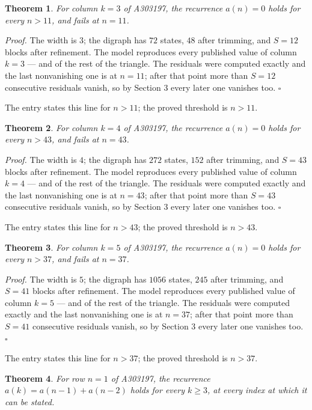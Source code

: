 \documentclass[11pt]{article}
\newtheorem{theorem}{Theorem}
\theoremstyle{definition}
\begin{document}
\begin{theorem} For column $k = 3$ of A303197, the recurrence $a(n) = 0$ holds for every $n > 11$, and fails at $n = 11$.\end{theorem}

{\itshape Proof.} The width is $3$; the digraph has $72$ states, $48$ after trimming, and $S = 12$ blocks after refinement. The model reproduces every published value of column $k = 3$ --- and of the rest of the triangle. The residuals were computed exactly and the last nonvanishing one is at $n = 11$; after that point more than $S = 12$ consecutive residuals vanish, so by Section 3 every later one vanishes too. $\square$

The entry states this line for $n > 11$; the proved threshold is $n > 11$.

\begin{theorem} For column $k = 4$ of A303197, the recurrence $a(n) = 0$ holds for every $n > 43$, and fails at $n = 43$.\end{theorem}

{\itshape Proof.} The width is $4$; the digraph has $272$ states, $152$ after trimming, and $S = 43$ blocks after refinement. The model reproduces every published value of column $k = 4$ --- and of the rest of the triangle. The residuals were computed exactly and the last nonvanishing one is at $n = 43$; after that point more than $S = 43$ consecutive residuals vanish, so by Section 3 every later one vanishes too. $\square$

The entry states this line for $n > 43$; the proved threshold is $n > 43$.

\begin{theorem} For column $k = 5$ of A303197, the recurrence $a(n) = 0$ holds for every $n > 37$, and fails at $n = 37$.\end{theorem}

{\itshape Proof.} The width is $5$; the digraph has $1056$ states, $245$ after trimming, and $S = 41$ blocks after refinement. The model reproduces every published value of column $k = 5$ --- and of the rest of the triangle. The residuals were computed exactly and the last nonvanishing one is at $n = 37$; after that point more than $S = 41$ consecutive residuals vanish, so by Section 3 every later one vanishes too. $\square$

The entry states this line for $n > 37$; the proved threshold is $n > 37$.

\begin{theorem} For row $n = 1$ of A303197, the recurrence $a(k) = a(n-1) + a(n-2)$ holds for every $k \ge 3$, at every index at which it can be stated.\end{theorem}
\end{document}
